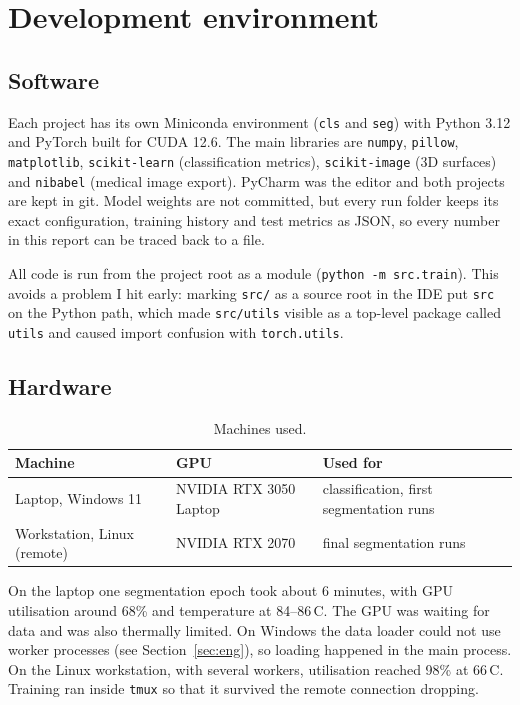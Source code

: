 \documentclass[11pt,a4paper]{article}
\newcommand{\code}[1]{\texttt{#1}}
\begin{document}
\section{Development environment}\label{sec:env}

\subsection{Software}

Each project has its own Miniconda environment (\code{cls} and \code{seg}) with
Python 3.12 and PyTorch built for CUDA 12.6. The main libraries are
\code{numpy}, \code{pillow}, \code{matplotlib}, \code{scikit-learn}
(classification metrics), \code{scikit-image} (3D surfaces) and \code{nibabel}
(medical image export). PyCharm was the editor and both projects are kept in git.
Model weights are not committed, but every run folder keeps its exact
configuration, training history and test metrics as JSON, so every number in this
report can be traced back to a file.

All code is run from the project root as a module (\code{python -m src.train}).
This avoids a problem I hit early: marking \code{src/} as a source root in the IDE
put \code{src} on the Python path, which made \code{src/utils} visible as a
top-level package called \code{utils} and caused import confusion with
\code{torch.utils}.

\subsection{Hardware}

\begin{table}[H]
\centering\small
\begin{tabular}{lll}
\toprule
\textbf{Machine} & \textbf{GPU} & \textbf{Used for} \\
\midrule
Laptop, Windows 11 & NVIDIA RTX 3050 Laptop & classification, first segmentation runs \\
Workstation, Linux (remote) & NVIDIA RTX 2070 & final segmentation runs \\
\bottomrule
\end{tabular}
\caption{Machines used.}
\end{table}

On the laptop one segmentation epoch took about 6 minutes, with GPU utilisation
around 68\% and temperature at 84--86\,\textdegree C. The GPU was waiting for data
and was also thermally limited. On Windows the data loader could not use worker
processes (see Section~\ref{sec:eng}), so loading happened in the main process.
On the Linux workstation, with several workers, utilisation reached 98\% at
66\,\textdegree C. Training ran inside \code{tmux} so that it survived the remote
connection dropping.
\end{document}
